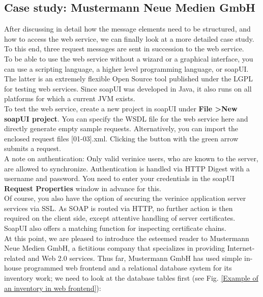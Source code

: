 \documentclass[a4paper,10pt]{book}
\begin{document}
\subsection{ Case study: Mustermann Neue Medien GmbH}
After discussing in detail how the message elements need to be structured, and how to access the web service,
we can finally look at a more detailed case study. To this end, three request messages are sent in succession
to the web service.
\newline\\
To be able to use the web service without a wizard or a graphical interface, you can use a scripting language,
a higher level programming language, or soapUI. The latter is an extremely flexible Open Source tool published
under the LGPL for testing web services. Since soapUI was developed in Java, it also runs on all platforms for
which a current JVM exists.
\newline\\
To test the web service, create a new project in soapUI under \textbf{File \textgreater New soapUI project}.
You can specify the WSDL file for the web service here and directly generate empty sample requests. Alternatively,
you can import the enclosed request files [01-03].xml. Clicking the button with the green arrow submits a request.
\newline\\
A note on authentication: Only valid verinice users, who are known to the server, are allowed to synchronize.
Authentication is handled via HTTP Digest with a username and password. You need to enter your credentials
in the soapUI \textbf{Request Properties} window in advance for this.
\newline\\
Of course, you also have the option of securing the verinice application server services via SSL. As SOAP is routed
via HTTP, no further action is then required on the client side, except attentive handling of server certificates.
SoapUI also offers a matching function for inspecting certificate chains.
\newline\\
At this point, we are pleased to introduce the esteemed reader to Mustermann Neue Medien GmbH, a fictitious company
that specializes in providing Internet-related and Web 2.0 services. Thus far, Mustermann GmbH has used simple
in-house programmed web frontend and a relational database system for its inventory work; we need to look at the
database tables first (see Fig. \ref{Example of an inventory in web frontend}):
\end{document}
